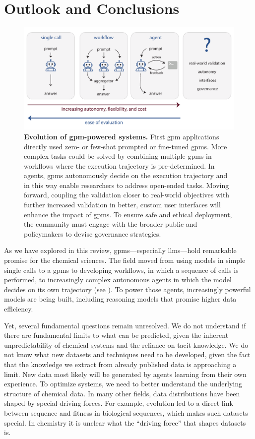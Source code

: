 \section{Outlook and Conclusions}
\begin{figure}[htb]
    \centering
    \includegraphics[width=1\linewidth]{figures/conclusion_figure_v2.pdf}
    \caption{\textbf{Evolution of \gls{gpm}-powered systems.} First \gls{gpm} applications directly used zero- or few-shot prompted or fine-tuned \glspl{gpm}. More complex tasks could be solved by combining multiple \glspl{gpm} in workflows where the execution trajectory is pre-determined. In agents, \glspl{gpm} autonomously decide on the execution trajectory and in this way enable researchers to address open-ended tasks. Moving forward, coupling the validation closer to real-world objectives with further increased validation in better, custom user interfaces will enhance the impact of \glspl{gpm}. To ensure safe and ethical deployment, the community must engage with the broader public and policymakers to devise governance strategies.}
    \label{fig:conclusions}
\end{figure}

As we have explored in this review, \glspl{gpm}---especially \glspl{llm}---hold remarkable promise for the chemical sciences. 
The field moved from using models in simple single calls to a \glspl{gpm} to developing workflows, in which a sequence of calls is performed, to increasingly complex autonomous agents in which the model decides on its own trajectory (see ). To power those agents, increasingly powerful models are being built, including reasoning models that promise higher data efficiency. 

Yet, several fundamental questions remain unresolved. We do not understand if there are fundamental limits to what can be predicted, given the inherent unpredictability of chemical systems and the reliance on tacit knowledge. We do not know what new datasets and techniques need to be developed, given the fact that the knowledge we extract from already published data is approaching a limit.\autocite{silver2025welcome} New data most likely will be generated by agents learning from their own experience.
To optimize systems, we need to better understand the underlying structure of chemical data.
In many other fields, data distributions have been shaped by special driving forces. 
For example, evolution led to a direct link between sequence and fitness in biological sequences, which makes such datasets special. In chemistry it is unclear what the \enquote{driving force} that shapes datasets is. 

